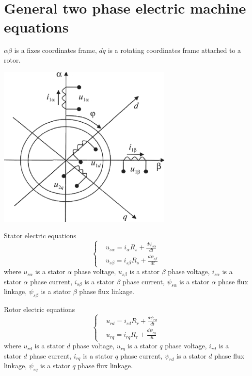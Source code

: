 \documentclass[11pt,a4paper,oneside]{report}
\begin{document}
\section{General two phase electric machine equations}

$\alpha\beta$ is a fixes coordinates frame, $dq$ is a rotating coordinates frame attached to a rotor.

\begin{center}
	\includegraphics[scale=1]{electric_scheme}
\end{center}

Stator electric equations	
\begin{equation}
	\left\{
	\begin{split}
		& u_{s\alpha} = i_{\alpha}R_s+\frac{d\psi_{s\alpha}}{dt}\\
		& u_{s\beta} = i_{s\beta}R_s+\frac{d\psi_{s\beta}}{dt}
	\end{split}
	\right.
\end{equation}
where $u_{s\alpha}$ is a stator $\alpha$ phase voltage, $u_{s\beta}$ is a stator $\beta$ phase voltage, $i_{s\alpha}$ is a stator $\alpha$ phase current, $i_{s\beta}$ is a stator $\beta$ phase current, $\psi_{s\alpha}$ is a stator $\alpha$ phase flux linkage,  $\psi_{s\beta}$ is a stator $\beta$ phase flux linkage.

Rotor electric equations
\begin{equation}
	\left\{
	\begin{split}
		& u_{rd} = i_{rd}R_r+\frac{d\psi_{rd}}{dt}\\
		& u_{rq} = i_{rq}R_r+\frac{d\psi_{rq}}{dt}
	\end{split}
	\right.
\end{equation}
where $u_{rd}$ is a stator $d$ phase voltage, $u_{rq}$ is a stator $q$ phase voltage, $i_{rd}$ is a stator $d$ phase current, $i_{rq}$ is a stator $q$ phase current, $\psi_{rd}$ is a stator $d$ phase flux linkage,  $\psi_{rq}$ is a stator $q$ phase flux linkage.
\end{document}
